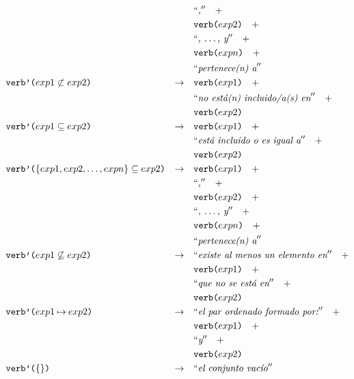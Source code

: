 \begin{align*}
& &											 		& \nlgtext{,} \quad +  \\
& &											 		& \nlgfun{verb($exp2$)} \quad +  \\
& &											 		& \nlgtext{, \ldots , y} \quad +  \\
& &											 		& \nlgfun{verb($expn$)} \quad +  \\
& &											 		& \nlgtext{pertenece(n) a}  \\
&\nlgfun{verb'($exp1 \not\subset exp2$)} & \rightarrow \quad & \nlgfun{verb($exp1$)} \quad +  \\
& &											 		& \nlgtext{no está(n) incluido/a(s) en} \quad +  \\
& &											 		& \nlgfun{verb($exp2$)} \\
&\nlgfun{verb'($exp1 \subseteq exp2$)} & \rightarrow \quad & \nlgfun{verb($exp1$)} \quad +  \\
& &											 		& \nlgtext{está incluido o es igual a} \quad +  \\
& &											 		& \nlgfun{verb($exp2$)} \\
&\nlgfun{verb'($\{exp1, exp2, \ldots , expn\} \subseteq exp2$)} & \rightarrow \quad & \nlgfun{verb($exp1$)} \quad +  \\
& &											 		& \nlgtext{,} \quad +  \\
& &											 		& \nlgfun{verb($exp2$)} \quad +  \\
& &											 		& \nlgtext{, \ldots , y} \quad +  \\
& &											 		& \nlgfun{verb($expn$)} \quad +  \\
& &											 		& \nlgtext{pertenece(n) a}  \\
&\nlgfun{verb'($exp1 \not\subseteq exp2$)} & \rightarrow \quad & \nlgtext{existe al menos un elemento en} \quad +  \\
& &											 		& \nlgfun{verb($exp1$)} \quad +  \\
& &											 		& \nlgtext{que no se está en} \quad +  \\
& &											 		& \nlgfun{verb($exp2$)} \\
&\nlgfun{verb'($exp1 \mapsto exp2$)} & \rightarrow \quad & \nlgtext{el par ordenado formado por:} \quad +  \\
& &											 		& \nlgfun{verb($exp1$)} \quad +  \\
& &											 		& \nlgtext{y} \quad +  \\
& &											 		& \nlgfun{verb($exp2$)} \\
&\nlgfun{verb'($\{\}$)} & \rightarrow \quad & \nlgtext{el conjunto vacío} \\

\end{align*}
